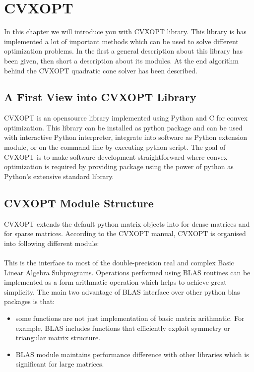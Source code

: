 
\chapter{CVXOPT} %

\label{ChapterX} %

In this chapter we will introduce you with CVXOPT library. This library is has implemented a lot of important methods which can be used to solve different optimization problems. In the first a general description about this library has been given, then short a description about its modules. At the end algorithm behind the CVXOPT quadratic cone solver has been described.
  
\section{A First View into CVXOPT Library}

CVXOPT is an opensource  library implemented using Python and C for convex optimization. This library can be installed as python package and can be used with interactive Python interpreter, integrate into software as Python extension module, or on the command line by executing python script. The goal of CVXOPT is to make software development straightforward where convex optimization is required by providing package using the power of python as Python's extensive standard library.


\section{CVXOPT Module Structure}
CVXOPT extends the default python matrix objects into  for dense matrices and  for sparse matrices. According to the CVXOPT manual, CVXOPT is organised into following different module:

\subsubsection*{}
This is the interface to most of the double-precision real and complex  Basic Linear Algebra Subprograms. Operations performed using BLAS routines can be implemented as a form arithmatic operation which helps to achieve great simplicity. The main two advantage of BLAS interface over other python blas packages is that:
\begin{itemize}
	\item some functions are not just implementation of basic matrix arithmatic. For example, BLAS includes functions that efficiently exploit symmetry or triangular matrix structure.
	\item BLAS module maintains performance difference with other libraries which is significant for large matrices.
\end{itemize}


